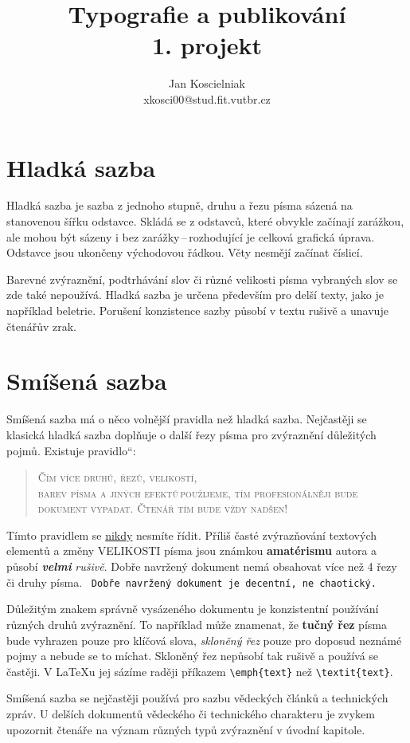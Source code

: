 \documentclass[11pt,a4paper,twocolumn]{article}
\title{Typografie a publikování \\ 1. projekt}
\author{Jan Koscielniak \\ xkosci00@stud.fit.vutbr.cz}
\date{}
\providecommand{\uv}[1]{\quotedblbase #1\textquotedblleft}
\begin{document}
\maketitle
\section{Hladká sazba}
Hladká sazba je sazba z jednoho stupně, druhu a řezu písma sázená na stanovenou šířku odstavce. Skládá se z odstavců, které obvykle začínají zarážkou, ale mohou být sázeny i bez zarážky\,--\,rozhodující je celková grafická úprava. Odstavce jsou ukončeny východovou řádkou. Věty nesmějí začínat číslicí.\par Barevné zvýraznění, podtrhávání slov či různé velikosti písma vybraných slov se zde také nepoužívá. Hladká sazba je určena především pro delší texty, jako je například beletrie. Porušení konzistence sazby působí v textu rušivě a unavuje čtenářův zrak.
\section{Smíšená sazba}
Smíšená sazba má o něco volnější pravidla než hladká sazba. Nejčastěji se klasická hladká sazba doplňuje o další řezy písma pro zvýraznění důležitých pojmů. Existuje \uv{pravidlo}:
\begin{quotation}\scshape
Čím více druhů, řezů, velikostí,\\barev písma a jiných efektů\,použije\-me, tím profesionálněji bude dokument vypadat. Čtenář tím bude vždy nadšen!\end{quotation}\par
Tímto pravidlem se \underline{nikdy} nesmíte řídit. Příliš časté zvýrazňování textových elementů a změny {\huge V}{\LARGE E}{\Large L}{\large I}{\normalsize K}{\small O}{\footnotesize S}{\scriptsize T}{\tiny I} písma {\Large jsou} {\LARGE známkou} \textbf{\huge ama\-térismu} autora a působí \emph{\bfseries velmi} \emph{rušivě}. Dobře navržený dokument nemá obsahovat více než 4 řezy či druhy písma. \texttt{ Dobře navržený dokument je decentní, ne chaotický.}\par
Důležitým znakem správně vysázeného dokumentu je konzistentní používání různých druhů zvýraznění. To například může znamenat, že \textbf{tučný řez} písma bude vyhrazen pouze pro klíčová slova, \emph{skloněný řez} pouze pro doposud neznámé pojmy a nebude se to míchat. Skloněný řez nepůsobí tak rušivě a používá se častěji. V \LaTeX u jej sázíme raději příkazem {\large\verb;\emph{text};} než {\large\verb;\textit{text};}.\par
Smíšená sazba se nejčastěji používá pro sazbu vědeckých článků a technických zpráv. U delších dokumentů vědeckého či technického charakteru je zvykem upozornit čtenáře na význam různých typů zvýraznění v úvodní kapitole.
\end{document}
